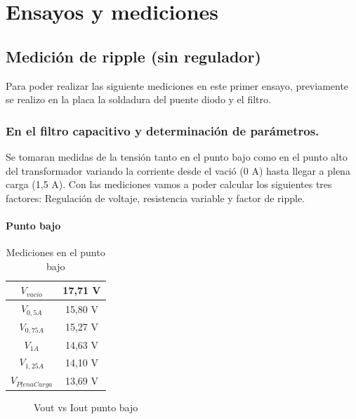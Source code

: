 \chapter{Ensayos y mediciones}

\section{Medición de ripple (sin regulador)}

Para poder realizar las siguiente mediciones en este primer ensayo, previamente se realizo en la placa la soldadura del puente diodo y el filtro.

\subsection{En el filtro capacitivo y determinación de parámetros.}

Se tomaran medidas de la tensión tanto en el punto bajo como en el punto alto del transformador variando la
corriente desde el vació (0 A) hasta llegar a plena carga (1,5 A). Con las mediciones vamos a poder calcular los siguientes tres factores:
Regulación de voltaje, resistencia variable y factor de ripple.\\

\subsubsection{Punto bajo}

\begin{table}[H]
  \centering
  \begin{tabular}{|c|c|}
    \hline
    $V_{vacio}$ & 17,71 V \\ \hline
    $V_{0,5 A}$ & 15,80 V \\ \hline
    $V_{0,75 A}$ & 15,27 V \\ \hline    
    $V_{1 A}$ & 14,63 V \\ \hline
    $V_{1,25 A}$ & 14,10 V \\ \hline
    $V_{PlenaCarga}$ & 13,69 V \\ \hline
  \end{tabular}
  \caption{Mediciones en el punto bajo}
\end{table}


\begin{figure}[H]
  \centering
  \caption{Vout vs Iout punto bajo}
\end{figure}

